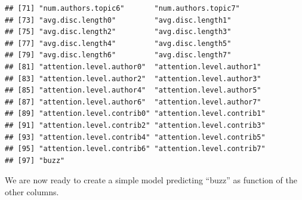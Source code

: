 \documentclass{article}\usepackage[]{graphicx}\usepackage[]{color}
\makeatletter
\newenvironment{kframe}{%
 \def\at@end@of@kframe{}%
 \ifinner\ifhmode%
  \def\at@end@of@kframe{\end{minipage}}%
  \begin{minipage}{\columnwidth}%
 \fi\fi%
 \def\FrameCommand##1{\hskip\@totalleftmargin \hskip-\fboxsep
 \colorbox{shadecolor}{##1}\hskip-\fboxsep
     \hskip-\linewidth \hskip-\@totalleftmargin \hskip\columnwidth}%
 \MakeFramed {\advance\hsize-\width
   \@totalleftmargin\z@ \linewidth\hsize
   \@setminipage}}%
 {\par\unskip\endMakeFramed%
 \at@end@of@kframe}
\newenvironment{knitrout}{}{} %
\makeatother
\begin{document}
\begin{knitrout}
\begin{kframe}
\begin{verbatim}
## [71] "num.authors.topic6"       "num.authors.topic7"      
## [73] "avg.disc.length0"         "avg.disc.length1"        
## [75] "avg.disc.length2"         "avg.disc.length3"        
## [77] "avg.disc.length4"         "avg.disc.length5"        
## [79] "avg.disc.length6"         "avg.disc.length7"        
## [81] "attention.level.author0"  "attention.level.author1" 
## [83] "attention.level.author2"  "attention.level.author3" 
## [85] "attention.level.author4"  "attention.level.author5" 
## [87] "attention.level.author6"  "attention.level.author7" 
## [89] "attention.level.contrib0" "attention.level.contrib1"
## [91] "attention.level.contrib2" "attention.level.contrib3"
## [93] "attention.level.contrib4" "attention.level.contrib5"
## [95] "attention.level.contrib6" "attention.level.contrib7"
## [97] "buzz"
\end{verbatim}
\end{kframe}
\end{knitrout}


We are now ready to create a simple model predicting ``buzz'' as function of the
other columns.
\end{document}
